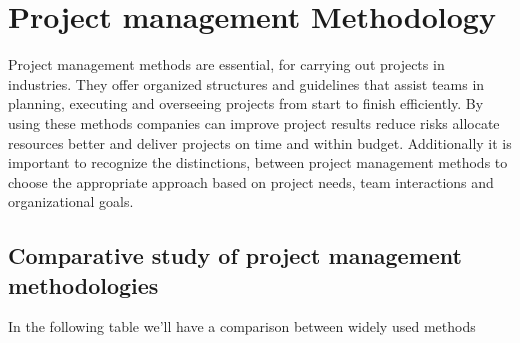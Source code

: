 \section{Project management Methodology}

Project management methods are essential, for carrying out projects in industries. They offer organized structures and guidelines that assist teams in planning, executing and overseeing projects from start to finish efficiently. By using these methods companies can improve project results reduce risks allocate resources better and deliver projects on time and within budget. Additionally it is important to recognize the distinctions, between project management methods to choose the appropriate approach based on project needs, team interactions and organizational goals.

\subsection{Comparative study of project management methodologies }
In the following table we'll have a comparison between widely used methods 
